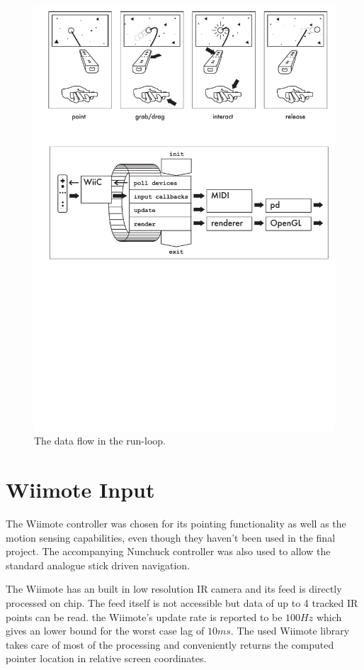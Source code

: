 \documentclass[10pt,a4paper]{scrartcl}
\begin{document}
\begin{figure}[hbtp]
\begin{center}
\includegraphics[width = 0.95 \columnwidth]{img/flow}
\caption{The data flow in the run-loop.}
\label{fig:flow}
\end{center}
\end{figure}





\section{Wiimote Input}
The Wiimote controller was chosen for its pointing functionality as well as the motion sensing capabilities, even though they haven't been used in the final project. The accompanying Nunchuck controller was also used to allow the standard analogue stick driven navigation.

The Wiimote has an built in low resolution IR camera and its feed is directly processed on chip. The feed itself is not accessible but data of up to 4 tracked IR points can be read. the Wiimote's update rate is reported to be $100Hz$ which gives an lower bound for the worst case lag of $10ms$. The used Wiimote library takes care of most of the processing and conveniently returns the computed pointer location in relative screen coordinates.
\end{document}
